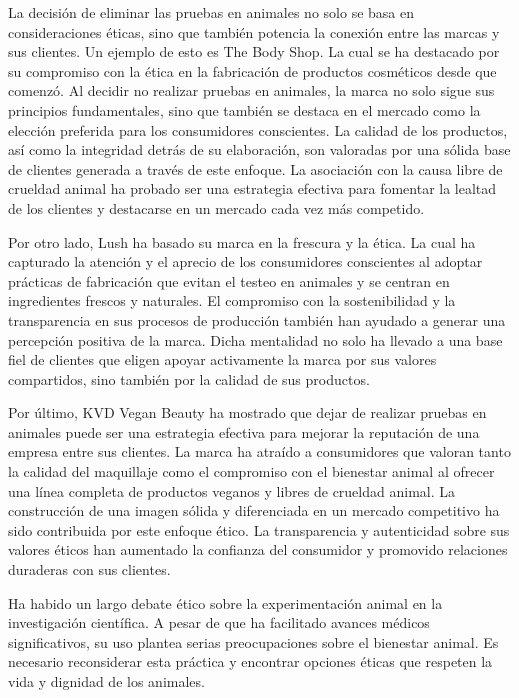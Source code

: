 \documentclass[letterpaper, 12pt]{report}
\begin{document}
La decisión de eliminar las pruebas en animales no solo se basa en
consideraciones éticas, sino que también potencia la conexión entre las
marcas y sus clientes. Un ejemplo de esto es The Body Shop. La cual se ha
destacado por su compromiso con la ética en la fabricación de productos
cosméticos desde que comenzó. Al decidir no realizar pruebas en animales,
la marca no solo sigue sus principios fundamentales, sino que también se
destaca en el mercado como la elección preferida para los consumidores
conscientes. La calidad de los productos, así como la integridad detrás de
su elaboración, son valoradas por una sólida base de clientes generada a
través de este enfoque. La asociación con la causa libre de crueldad animal
ha probado ser una estrategia efectiva para fomentar la lealtad de los
clientes y destacarse en un mercado cada vez más competido.

Por otro lado, Lush ha basado su marca en la frescura y la ética. La cual
ha capturado la atención y el aprecio de los consumidores conscientes al
adoptar prácticas de fabricación que evitan el testeo en animales y se
centran en ingredientes frescos y naturales. El compromiso con la
sostenibilidad y la transparencia en sus procesos de producción también
han ayudado a generar una percepción positiva de la marca. Dicha mentalidad
no solo ha llevado a una base fiel de clientes que eligen apoyar activamente
la marca por sus valores compartidos, sino también por la calidad
de sus productos.

Por último, KVD Vegan Beauty ha mostrado que dejar de realizar pruebas en
animales puede ser una estrategia efectiva para mejorar la reputación de una
empresa entre sus clientes. La marca ha atraído a consumidores que valoran
tanto la calidad del maquillaje como el compromiso con el bienestar animal
al ofrecer una línea completa de productos veganos y libres de crueldad
animal. La construcción de una imagen sólida y diferenciada en un mercado
competitivo ha sido contribuida por este enfoque ético. La transparencia y
autenticidad sobre sus valores éticos han aumentado la confianza del
consumidor y promovido relaciones duraderas con sus clientes.

Ha habido un largo debate ético sobre la experimentación animal en la
investigación científica. A pesar de que ha facilitado avances médicos
significativos, su uso plantea serias preocupaciones sobre el bienestar
animal. Es necesario reconsiderar esta práctica y encontrar opciones éticas
que respeten la vida y dignidad de los animales.
\end{document}
